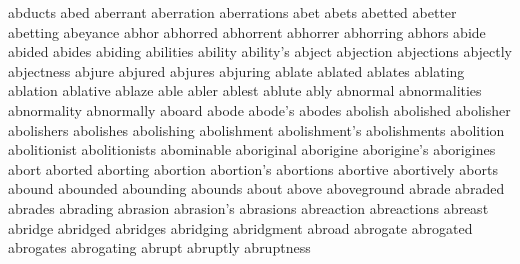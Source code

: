 abducts
abed
aberrant
aberration
aberrations
abet
abets
abetted
abetter
abetting
abeyance
abhor
abhorred
abhorrent
abhorrer
abhorring
abhors
abide
abided
abides
abiding
abilities
ability
ability's
abject
abjection
abjections
abjectly
abjectness
abjure
abjured
abjures
abjuring
ablate
ablated
ablates
ablating
ablation
ablative
ablaze
able
abler
ablest
ablute
ably
abnormal
abnormalities
abnormality
abnormally
aboard
abode
abode's
abodes
abolish
abolished
abolisher
abolishers
abolishes
abolishing
abolishment
abolishment's
abolishments
abolition
abolitionist
abolitionists
abominable
aboriginal
aborigine
aborigine's
aborigines
abort
aborted
aborting
abortion
abortion's
abortions
abortive
abortively
aborts
abound
abounded
abounding
abounds
about
above
aboveground
abrade
abraded
abrades
abrading
abrasion
abrasion's
abrasions
abreaction
abreactions
abreast
abridge
abridged
abridges
abridging
abridgment
abroad
abrogate
abrogated
abrogates
abrogating
abrupt
abruptly
abruptness

